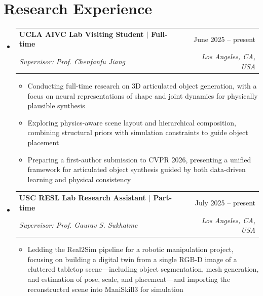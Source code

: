\documentclass[letterpaper,11pt]{article}
\newcommand{\resumeItem}[1]{
  \item\small{
    {#1 \vspace{-2pt}}
  }
}
\newcommand{\resumeSubheading}[4]{
  \vspace{-2pt}\item
    \begin{tabularx}{\textwidth}[t]{X r}
      \textbf{#1} & #2 \\
      \textit{\small#3} & \textit{\small #4} \\
    \end{tabularx}\vspace{-7pt}
}
\newcommand{\resumeSubHeadingListStart}{\begin{itemize}[leftmargin=0in, label={}]}
\newcommand{\resumeSubHeadingListEnd}{\end{itemize}}
\newcommand{\resumeItemListStart}{\begin{itemize}}
\newcommand{\resumeItemListEnd}{\end{itemize}\vspace{-5pt}}
\begin{document}
\section{Research Experience}

\resumeSubHeadingListStart
  \resumeSubheading
  {UCLA AIVC Lab Visiting Student $|$ \normalfont Full-time}{June 2025 – present}
  {Supervisor: Prof. Chenfanfu Jiang}{Los Angeles, CA, USA}
  \resumeItemListStart
    \resumeItem{Conducting full-time research on 3D articulated object generation, with a focus on neural representations of shape and joint dynamics for physically plausible synthesis}
    \resumeItem{Exploring physics-aware scene layout and hierarchical composition, combining structural priors with simulation constraints to guide object placement}
    \resumeItem{Preparing a first-author submission to CVPR 2026, presenting a unified framework for articulated object synthesis guided by both data-driven learning and physical consistency}
  \resumeItemListEnd

  \resumeSubheading
  {USC RESL Lab Research Assistant $|$ \normalfont Part-time}{July 2025 – present}
  {Supervisor: Prof. Gaurav S. Sukhatme}{Los Angeles, CA, USA}
  \resumeItemListStart
    \resumeItem{Ledding the Real2Sim pipeline for a robotic manipulation project, focusing on building a digital twin from a single RGB-D image of a cluttered tabletop scene—including object segmentation, mesh generation, and estimation of pose, scale, and placement—and importing the reconstructed scene into ManiSkill3 for simulation}
  \resumeItemListEnd

\resumeSubHeadingListEnd
\end{document}
